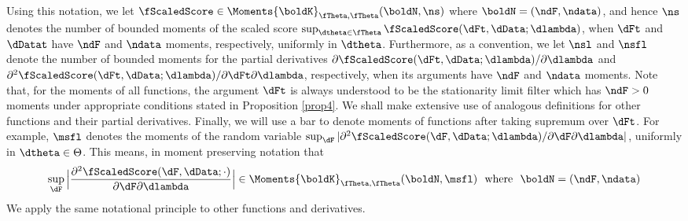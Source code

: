 Using this notation, we let $\fScaledScore \in \Moments{\boldK}_{\fTheta,\fTheta}(\boldN,\ns)$ where $\boldN=(\ndF,\ndata)$, and hence $\ns$ denotes the number of bounded moments of the scaled score $\sup_{\dtheta \in \fTheta}\fScaledScore(\dFt,\dData;\dlambda)$, when $\dFt$ and $\dDatat$ have $\ndF$ and $\ndata$ moments, respectively, uniformly in $\dtheta$. 
Furthermore, as a convention, we let $\nsl$ and $\nsfl$ denote the number of bounded moments for the partial derivatives
$\partial\fScaledScore(\dFt,\dData;\dlambda)/\partial\dlambda$
and
$\partial^2\fScaledScore(\dFt,\dData;\dlambda)/\partial\dFt\partial\dlambda$, 
respectively, when its arguments have $\ndF$ and $\ndata$ moments.
Note that, for the moments of all functions, the argument 
$\dFt$ is always understood to be the stationarity limit filter which has 
$\ndF>0$ moments under appropriate conditions stated in Proposition 
\ref{prop4}. We shall make extensive use of analogous definitions for other 
functions and their partial derivatives.  Finally, we will use a bar to denote moments 
of functions after taking supremum over $\dFt$. For example, $\msfl$  denotes 
the moments of the random variable
$\sup_{\dF}|\partial^2\fScaledScore(\dF,\dData;\dlambda)/ \partial\dF\partial\dlambda|$, uniformly in $\dtheta  \in \Theta$. This means, in moment preserving notation that 
\begin{equation*}
\sup_{\dF}\Big|\frac{\partial^2\fScaledScore(\dF,\dData;\cdot)}{\partial\dF\partial\dlambda} \Big| \in  \Moments{\boldK}_{\fTheta,\fTheta}(\boldN,\msfl) \ \text{ where } \  \boldN=(\ndF,\ndata)
\end{equation*}
We apply the same notational principle to other functions and derivatives.




